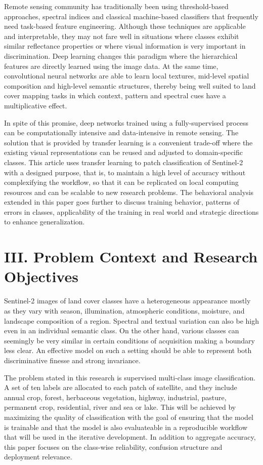 ﻿\documentclass[conference]{IEEEtran}
\begin{document}
Remote sensing community has traditionally been using threshold-based approaches, spectral indices and classical machine-based classifiers that frequently need task-based feature engineering. Although these techniques are applicable and interpretable, they may not fare well in situations where classes exhibit similar reflectance properties or where visual information is very important in discrimination. Deep learning changes this paradigm where the hierarchical features are directly learned using the image data. At the same time, convolutional neural networks are able to learn local textures, mid-level spatial composition and high-level semantic structures, thereby being well suited to land cover mapping tasks in which context, pattern and spectral cues have a multiplicative effect.

In spite of this promise, deep networks trained using a fully-supervised process can be computationally intensive and data-intensive in remote sensing. The solution that is provided by transfer learning is a convenient trade-off where the existing visual representations can be reused and adjusted to domain-specific classes. This article uses transfer learning to patch classification of Sentinel-2 with a designed purpose, that is, to maintain a high level of accuracy without complexifying the workflow, so that it can be replicated on local computing resources and can be scalable to new research problems. The behavioral analysis extended in this paper goes further to discuss training behavior, patterns of errors in classes, applicability of the training in real world and strategic directions to enhance generalization.

\section*{III. Problem Context and Research Objectives}

Sentinel-2 images of land cover classes have a heterogeneous appearance mostly as they vary with season, illumination, atmospheric conditions, moisture, and landscape composition of a region. Spectral and textual variation can also be high even in an individual semantic class. On the other hand, various classes can seemingly be very similar in certain conditions of acquisition making a boundary less clear. An effective model on such a setting should be able to represent both discriminative finesse and strong invariance.

The problem stated in this research is supervised multi-class image classification. A set of ten labels are allocated to each patch of satellite, and they include annual crop, forest, herbaceous vegetation, highway, industrial, pasture, permanent crop, residential, river and sea or lake. This will be achieved by maximizing the quality of classification with the goal of ensuring that the model is trainable and that the model is also evaluateable in a reproducible workflow that will be used in the iterative development. In addition to aggregate accuracy, this paper focuses on the class-wise reliability, confusion structure and deployment relevance.
\end{document}

